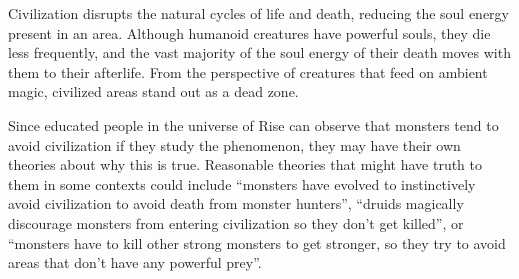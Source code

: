       Civilization disrupts the natural cycles of life and death, reducing the soul energy present in an area.
      Although humanoid creatures have powerful souls, they die less frequently, and the vast majority of the soul energy of their death moves with them to their afterlife.
      From the perspective of creatures that feed on ambient magic, civilized areas stand out as a dead zone.

      Since educated people in the universe of Rise can observe that monsters tend to avoid civilization if they study the phenomenon, they may have their own theories about why this is true.
      Reasonable theories that might have truth to them in some contexts could include ``monsters have evolved to instinctively avoid civilization to avoid death from monster hunters'', ``druids magically discourage monsters from entering civilization so they don't get killed'', or ``monsters have to kill other strong monsters to get stronger, so they try to avoid areas that don't have any powerful prey''.
